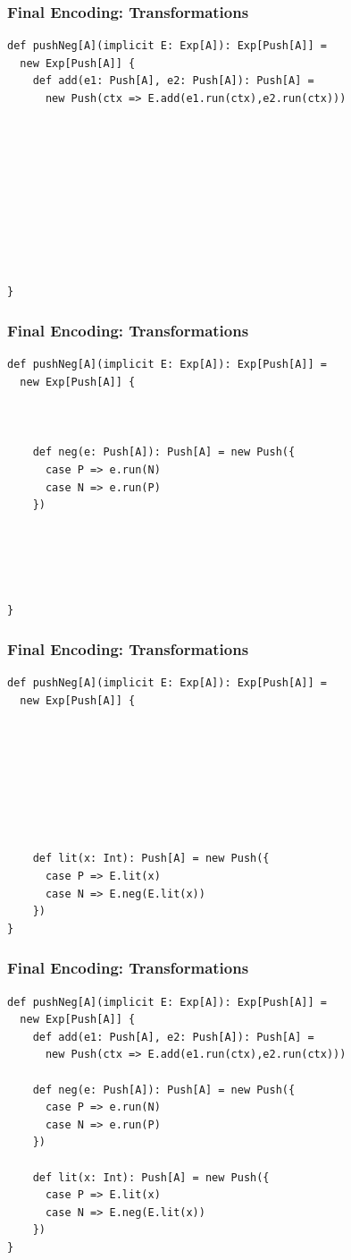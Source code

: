 \documentclass{beamer}
\begin{document}
\begin{frame}[fragile]
  \addtocounter{framenumber}{-1}
  \frametitle{Final Encoding: Transformations}
\begin{verbatim}
def pushNeg[A](implicit E: Exp[A]): Exp[Push[A]] =
  new Exp[Push[A]] {
    def add(e1: Push[A], e2: Push[A]): Push[A] =
      new Push(ctx => E.add(e1.run(ctx),e2.run(ctx)))










}
\end{verbatim}
\end{frame}

\begin{frame}[fragile]
  \addtocounter{framenumber}{-1}
  \frametitle{Final Encoding: Transformations}
\begin{verbatim}
def pushNeg[A](implicit E: Exp[A]): Exp[Push[A]] =
  new Exp[Push[A]] {



    def neg(e: Push[A]): Push[A] = new Push({
      case P => e.run(N)
      case N => e.run(P)
    })





}
\end{verbatim}
\end{frame}

\begin{frame}[fragile]
  \addtocounter{framenumber}{-1}
  \frametitle{Final Encoding: Transformations}
\begin{verbatim}
def pushNeg[A](implicit E: Exp[A]): Exp[Push[A]] =
  new Exp[Push[A]] {








    def lit(x: Int): Push[A] = new Push({
      case P => E.lit(x)
      case N => E.neg(E.lit(x))
    })
}
\end{verbatim}
\end{frame}

\begin{frame}[fragile]
  \addtocounter{framenumber}{-1}
  \frametitle{Final Encoding: Transformations}
\begin{verbatim}
def pushNeg[A](implicit E: Exp[A]): Exp[Push[A]] =
  new Exp[Push[A]] {
    def add(e1: Push[A], e2: Push[A]): Push[A] =
      new Push(ctx => E.add(e1.run(ctx),e2.run(ctx)))

    def neg(e: Push[A]): Push[A] = new Push({
      case P => e.run(N)
      case N => e.run(P)
    })

    def lit(x: Int): Push[A] = new Push({
      case P => E.lit(x)
      case N => E.neg(E.lit(x))
    })
}
\end{verbatim}
\end{frame}
\end{document}
